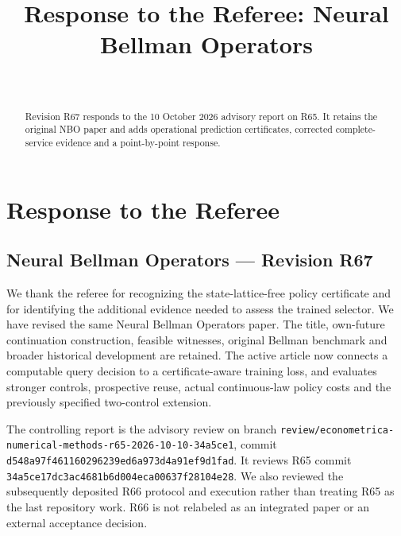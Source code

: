 \documentclass[ecta,nameyear,draft]{econsocart}
\begin{document}
\begin{frontmatter}
\title{Response to the Referee: Neural Bellman Operators}
\begin{aug}
\author[id=au1,addressref={add1}]{~}
\address[id=add1]{Peking University}
\end{aug}
\begin{abstract}Revision R67 responds to the 10 October 2026 advisory report on R65. It retains the original NBO paper and adds operational prediction certificates, corrected complete-service evidence and a point-by-point response.\end{abstract}
\end{frontmatter}
\providecommand{\tightlist}{\setlength{\itemsep}{0pt}\setlength{\parskip}{0pt}}
\hypertarget{response-to-the-referee}{%
\section{Response to the Referee}\label{response-to-the-referee}}

\hypertarget{neural-bellman-operators-revision-r67}{%
\subsection{Neural Bellman Operators --- Revision
R67}\label{neural-bellman-operators-revision-r67}}

We thank the referee for recognizing the state-lattice-free policy
certificate and for identifying the additional evidence needed to assess
the trained selector. We have revised the same Neural Bellman Operators
paper. The title, own-future continuation construction, feasible
witnesses, original Bellman benchmark and broader historical development
are retained. The active article now connects a computable query
decision to a certificate-aware training loss, and evaluates stronger
controls, prospective reuse, actual continuous-law policy costs and the
previously specified two-control extension.

The controlling report is the advisory review on branch
\nolinkurl{review/econometrica-numerical-methods-r65-2026-10-10-34a5ce1},
commit \nolinkurl{d548a97f461160296239ed6a973d4a91ef9d1fad}. It reviews R65
commit \nolinkurl{34a5ce17dc3ac4681b6d004eca00637f28104e28}. We also
reviewed the subsequently deposited R66 protocol and execution rather
than treating R65 as the last repository work. R66 is not relabeled as
an integrated paper or an external acceptance decision.
\end{document}
